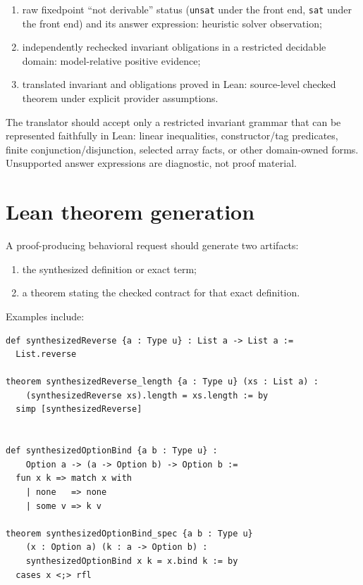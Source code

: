 \documentclass[10pt,letterpaper,oneside]{report}
\newcommand{\code}[1]{\texttt{\detokenize{#1}}}
\newcommand{\sat}{\texttt{sat}}
\newcommand{\unsat}{\texttt{unsat}}
\begin{document}
\begin{enumerate}
\item raw fixedpoint ``not derivable'' status (\unsat{} under the \code{query} front end, \sat{} under the \code{check-sat} front end) and its answer expression: heuristic solver observation;
\item independently rechecked invariant obligations in a restricted decidable domain: model-relative positive evidence;
\item translated invariant and obligations proved in Lean: source-level checked theorem under explicit provider assumptions.
\end{enumerate}

The translator should accept only a restricted invariant grammar that can be represented faithfully in Lean: linear inequalities, constructor/tag predicates, finite conjunction/disjunction, selected array facts, or other domain-owned forms. Unsupported answer expressions are diagnostic, not proof material.

\section{Lean theorem generation}

A proof-producing behavioral request should generate two artifacts:

\begin{enumerate}
\item the synthesized definition or exact term;
\item a theorem stating the checked contract for that exact definition.
\end{enumerate}

Examples include:

\begin{lstlisting}[language=LeanX,caption={Proof-artifact shapes.}]
def synthesizedReverse {a : Type u} : List a -> List a :=
  List.reverse

theorem synthesizedReverse_length {a : Type u} (xs : List a) :
    (synthesizedReverse xs).length = xs.length := by
  simp [synthesizedReverse]


def synthesizedOptionBind {a b : Type u} :
    Option a -> (a -> Option b) -> Option b :=
  fun x k => match x with
    | none   => none
    | some v => k v

theorem synthesizedOptionBind_spec {a b : Type u}
    (x : Option a) (k : a -> Option b) :
    synthesizedOptionBind x k = x.bind k := by
  cases x <;> rfl
\end{lstlisting}
\end{document}
